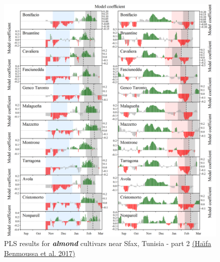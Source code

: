 \documentclass[
]{book}
\begin{document}
\begin{figure}
\centering
\includegraphics{pictures/PLS_chill_force_almonds2_Tunisia.png}
\caption{PLS results for \textbf{\emph{almond}} cultivars near Sfax, Tunisia - part 2 \href{https://www.sciencedirect.com/science/article/abs/pii/S0168192317300734}{(Haı̈fa Benmoussa et al. \protect\hyperlink{ref-benmoussa2017chilling}{2017})}}
\end{figure}
\end{document}
